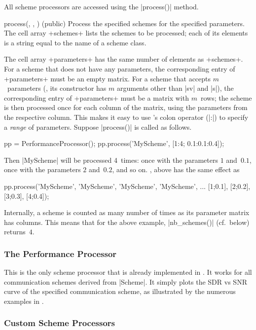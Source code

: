 All scheme processors are accessed using the |process()| method.
\begin{method}{process(\obj, , ) (public)}
  Process the specified schemes for the specified parameters. The cell array
  +schemes+ lists the schemes to be processed; each of its elements is a string
  equal to the name of a scheme class.

  The cell array +parameters+ has the same number of elements as +schemes+. For
  a scheme that does not have any parameters, the corresponding entry of
  +parameters+ must be an empty matrix.  For a scheme that accepts
  $m$~parameters (\ie, its constructor has $m$ arguments other than |sv| and
  |s|), the corresponding entry of +parameters+ must be a matrix with
  $m$~rows; the scheme is then processed once for each
  column of the matrix, using the parameters from the respective column.
  This makes it easy to use \matlab's colon operator (|:|) to specify a
  \emph{range} of parameters.
  \codeexample Suppose |process()| is called as follows.
  \begin{Code}
  pp = PerformanceProcessor();
  pp.process({'MyScheme'}, {[1:4; 0.1:0.1:0.4]});
  \end{Code}
  Then |MyScheme| will be processed 4~times: once with the parameters $1$
  and~$0.1$, once with the parameters $2$ and~$0.2$, and so on. \Ie, 
  above has the same effect as
  \begin{Code}
  pp.process({'MyScheme', 'MyScheme', 'MyScheme', 'MyScheme'}, ...
    {[1;0.1], [2;0.2], [3;0.3], [4;0.4]});
  \end{Code}

  Internally, a scheme is counted as many number of times as its parameter
  matrix has columns. This means that for the above example, |nb_schemes()|
  (cf.~below) returns~$4$.

\end{method}


\subsubsection{The Performance Processor}

This is the only scheme processor that is already implemented in \jscsim. It
works for all communication schemes derived from |Scheme|. It simply plots the
SDR vs SNR curve of the specified communication scheme, as illustrated by the
numerous examples in .


\subsubsection{Custom Scheme Processors}


